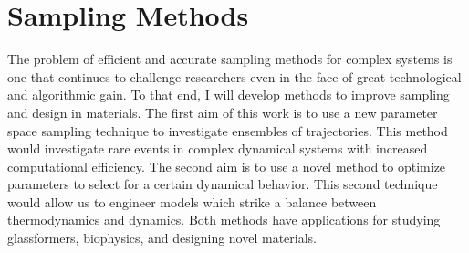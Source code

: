 \documentclass[11pt]{article}
\begin{document}
\section{Sampling Methods}

The problem of efficient and accurate sampling methods for complex systems is one that continues to challenge researchers even in the face of great technological and algorithmic gain.  To that end, I will develop methods to improve sampling and design in materials.  The first aim of this work is to use a new parameter space sampling technique to investigate ensembles of trajectories.  This method would investigate rare events in complex dynamical systems with increased computational efficiency. The second aim is to use a novel method to optimize parameters to select for a certain dynamical behavior.  This second technique would allow us to engineer models which strike a balance between thermodynamics and dynamics.  Both methods have applications for studying glassformers, biophysics, and designing novel materials.


\end{document}
